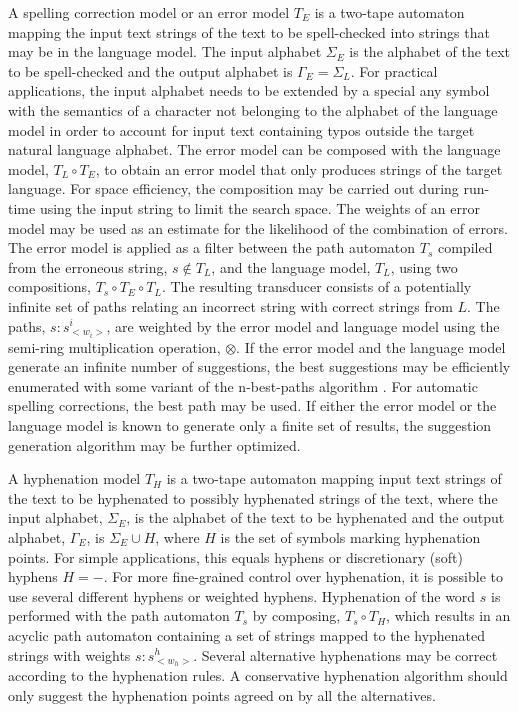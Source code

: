 \documentclass[postprint]{flammie}
\begin{document}
A spelling correction model or an error model $T_E$ is a two-tape
automaton mapping the input text strings of the text to be
spell-checked into strings that may be in the language model. The
input alphabet $\Sigma_E$ is the alphabet of the text to be
spell-checked and the output alphabet is $\Gamma_E = \Sigma_L$. For
practical applications, the input alphabet needs to be extended by a
special any symbol with the semantics of a character not belonging to
the alphabet of the language model in order to account for input text
containing typos outside the target natural language alphabet. The
error model can be composed with the language model, $T_L \circ T_E$,
to obtain an error model that only produces strings of the target
language. For space efficiency, the composition may be carried out
during run-time using the input string to limit the search space. The
weights of an error model may be used as an estimate for the likelihood of the
combination of errors. The error model is applied as a filter between
the path automaton $T_s$ compiled from the erroneous string, $s \notin
T_L$, and the language model, $T_L$, using two compositions, $T_s
\circ T_E \circ T_L$. The resulting transducer consists of a
potentially infinite set of paths relating an incorrect string with
correct strings from $L$. The paths, $s:s^i_{<w_i>}$, are weighted by
the error model and language model using the semi-ring multiplication
operation, $\otimes$. If the error model and the language model
generate an infinite number of suggestions, the best suggestions may
be efficiently enumerated with some variant of the n-best-paths
algorithm \cite{mohri/2002}. For automatic spelling corrections, the
best path may be used. If either the error model or the language model
is known to generate only a finite set of results, the suggestion
generation algorithm may be further optimized.

A hyphenation model $T_H$ is a two-tape automaton mapping input text
strings of the text to be hyphenated to possibly hyphenated strings of
the text, where the input alphabet, $\Sigma_E$, is the alphabet of the
text to be hyphenated and the output alphabet, $\Gamma_E$, is
$\Sigma_E \cup H$, where $H$ is the set of symbols marking hyphenation
points. For simple applications, this equals hyphens or discretionary
(soft) hyphens $H = {-}$. For more fine-grained control over
hyphenation, it is possible to use several different hyphens or
weighted hyphens.  Hyphenation of the word $s$ is performed with the
path automaton $T_s$ by composing, $T_s \circ T_H$, which results in
an acyclic path automaton containing a set of strings mapped to the
hyphenated strings with weights $s:s^h_{<w_h>}$. Several alternative hyphenations
may be correct according to the hyphenation rules. A conservative hyphenation algorithm
should only suggest the hyphenation points agreed on by all the alternatives.
\end{document}

